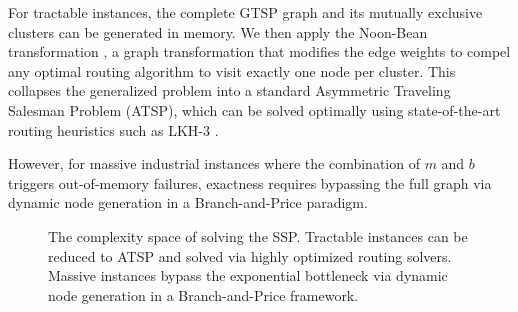 \documentclass[12pt]{article}
\begin{document}
For tractable instances, the complete GTSP graph and its mutually exclusive clusters can be generated in memory. We then apply the Noon-Bean transformation \citep{Noon1993}, a graph transformation that modifies the edge weights to compel any optimal routing algorithm to visit exactly one node per cluster. This collapses the generalized problem into a standard Asymmetric Traveling Salesman Problem (ATSP), which can be solved optimally using state-of-the-art routing heuristics such as LKH-3 \citep{Helsgaun2015}.

However, for massive industrial instances where the combination of $m$ and $b$ triggers out-of-memory failures, exactness requires bypassing the full graph via dynamic node generation in a Branch-and-Price paradigm.

\begin{figure}[h!]
	\centering
	\caption{The complexity space of solving the SSP. Tractable instances can be reduced to ATSP and solved via highly optimized routing solvers. Massive instances bypass the exponential bottleneck via dynamic node generation in a Branch-and-Price framework.}
	\label{fig:complexity_flowchart}
\end{figure}
\end{document}
